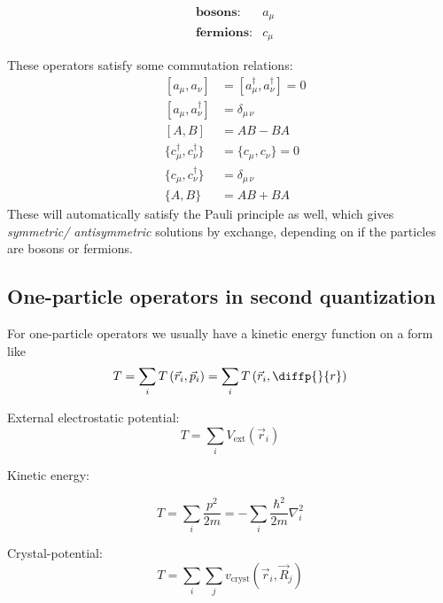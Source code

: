\begin{align*}
&\textbf{bosons}: &a_\mu \\ 
&\textbf{fermions}: &c_\mu
\end{align*}


These operators satisfy some commutation relations:
\begin{align}
&[a_\mu, a_{\nu}] & = [a_\mu^\dagger, a_{\nu}^\dagger] = 0 \\
&[a_\mu, a_{\nu}^\dagger] & = \delta_{\mu\,\nu} \\
&[A,B] &= AB-BA \\
&\{c_\mu^\dagger, c_{\nu}^\dagger\} & = \{c_\mu, c_{\nu}\} = 0 \\
&\{c_\mu, c_{\nu}^\dagger\} & = \delta_{\mu\,\nu} \\
&\{A,B\} &= AB + BA
\end{align}
These will automatically satisfy the Pauli principle as well, which gives \emph{symmetric/ antisymmetric} solutions by exchange, depending on if the particles are bosons or fermions. 


\subsection{One-particle operators in second quantization}

For one-particle operators we usually have a kinetic energy function on a form like
\begin{equation}
T = \sum_i T\left(\vec{r}_i, \vec{p}_i\right) = \sum_i T\left(\vec{r}_i, \diffp{}{r}\right)
\end{equation}
\begin{theorem}
External electrostatic potential:
\begin{equation}
T = \sum_i V_{\text{ext}}\left(\vec{r}_i\right)
\end{equation}
\end{theorem}
\begin{theorem}

Kinetic energy:

\begin{equation}
T = \sum_i \frac{p^2}{2m} = -\sum_i \frac{\hbar^2}{2m}\nabla_i^2
\end{equation}
\end{theorem}

\begin{theorem}
Crystal-potential:
\begin{equation}
T = \sum_i \sum_j v_{\text{cryst}} \left( \vec{r}_i, \vec{R}_j \right)
\end{equation}
\end{theorem}

